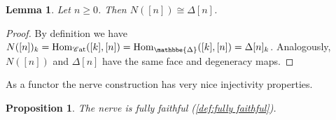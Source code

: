 \documentclass[11pt, a4paper]{amsart}
\def\DDelta{{\mathbbe{\Delta}}}
\newcommand{\DD}{\DDelta}
\newcommand{\Hom}{\mathrm{Hom}}
\newcommand{\Cat}{\mathscr{C}\mathrm{at}}
\newtheorem{lemma}[equation]{Lemma}
\newtheorem{proposition}[equation]{Proposition}
\theoremstyle{definition}
\theoremstyle{remark}
\numberwithin{equation}{section}
\begin{document}
\begin{lemma}
 Let $n \geq 0$. Then $N([n]) \cong \Delta[n]$.
\end{lemma}

\begin{proof}
 By definition we have $N([n])_k = \Hom_{\Cat}([k],[n]) = \Hom_\DD([k],[n]) = \Delta[n]_k$. Analogously, $N([n])$ and $\Delta[n]$ have the same face and degeneracy maps. 
\end{proof}

As a functor the nerve construction has very nice injectivity properties.

\begin{proposition} \label{prop:nerve fully faithful}
 The nerve is fully faithful (\cref{def:fully faithful}).
\end{proposition}
\end{document}
